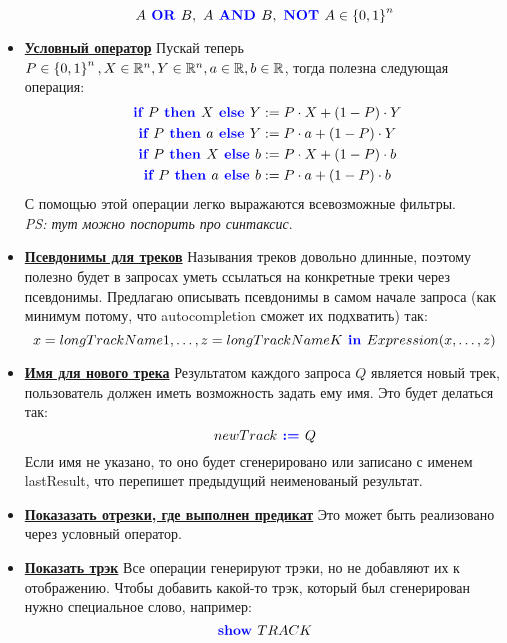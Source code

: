 \begin{itemize}
	\[
		A \text{\textbf{\color{blue}{ OR }}} B,\ A \text{\textbf{\color{blue}{ AND }}} B,\ \text{\textbf{\color{blue}{NOT }}} A \in  \left\lbrace 0, 1 \right\rbrace^n
	\]
	\item \textbf{\underline{Условный оператор}} Пускай теперь $P \in \left\lbrace 0, 1 \right\rbrace^n, X \in \mathbb{R}^n, Y \in \mathbb{R}^n, a \in \mathbb{R}, b \in \mathbb{R}$, тогда полезна следующая операция:
	\begin{align*}
		\text{\textbf{\color{blue}{ if }}} P \text{\textbf{\color{blue}{ then }}} X \text{\textbf{\color{blue}{ else }}} Y &:= P \cdot X + (1 - P) \cdot Y \\
		\text{\textbf{\color{blue}{ if }}} P \text{\textbf{\color{blue}{ then }}} a \text{\textbf{\color{blue}{ else }}} Y &:= P \cdot a + (1 - P) \cdot Y \\
		\text{\textbf{\color{blue}{ if }}} P \text{\textbf{\color{blue}{ then }}} X \text{\textbf{\color{blue}{ else }}} b &:= P \cdot X + (1 - P) \cdot b \\
		\text{\textbf{\color{blue}{ if }}} P \text{\textbf{\color{blue}{ then }}} a \text{\textbf{\color{blue}{ else }}} b &:= P \cdot a + (1 - P) \cdot b
	\end{align*}
	С помощью этой операции легко выражаются всевозможные фильтры.
	\\\emph{PS: тут можно поспорить про синтаксис}.
	\item \textbf{\underline{Псевдонимы для треков}} Называния треков довольно длинные, поэтому полезно будет в запросах уметь ссылаться на конкретные треки через псевдонимы. Предлагаю описывать псевдонимы в самом начале запроса (как минимум потому, что autocompletion сможет их подхватить) так:
	\[
		x = longTrackName1, \ldots, z = longTrackNameK \text{\textbf{\color{blue}{ in }}} Expression(x, \ldots, z)
	\]
	\item \textbf{\underline{Имя для нового трека}} Результатом каждого запроса $Q$ является новый трек, пользователь должен иметь возможность задать ему имя. Это будет делаться так:
	\[
		newTrack \text{\textbf{\color{blue}{ := }}} Q
	\]
	Если имя не указано, то оно будет сгенерировано или записано с именем lastResult, что перепишет предыдущий неименованый результат.

	\item \textbf{\underline{Показазать отрезки, где выполнен предикат}} Это может быть реализовано через условный оператор.

	\item \textbf{\underline{Показать трэк}} Все операции генерируют трэки, но не добавляют их к отображению. Чтобы добавить какой-то трэк, который был сгенерирован нужно специальное слово, например:
	\[
		\text{\textbf{\color{blue}{show }}} TRACK
	\]
\end{itemize}

